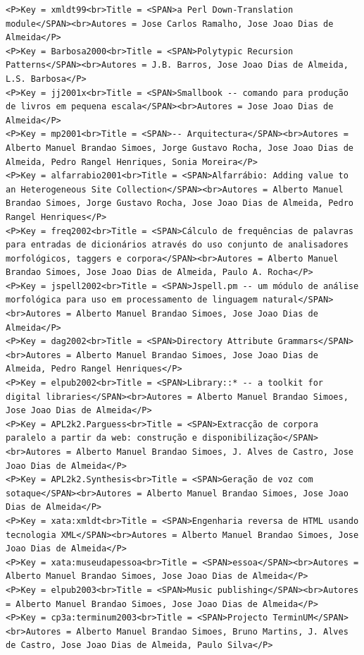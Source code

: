 \documentclass[11pt,a4paper]{report}
\begin{document}
\begin{appendices}
\begin{lstlisting}
<P>Key = xmldt99<br>Title = <SPAN>a Perl Down-Translation module</SPAN><br>Autores = Jose Carlos Ramalho, Jose Joao Dias de Almeida</P>
<P>Key = Barbosa2000<br>Title = <SPAN>Polytypic Recursion Patterns</SPAN><br>Autores = J.B. Barros, Jose Joao Dias de Almeida, L.S. Barbosa</P>
<P>Key = jj2001x<br>Title = <SPAN>Smallbook -- comando para produção de livros em pequena escala</SPAN><br>Autores = Jose Joao Dias de Almeida</P>
<P>Key = mp2001<br>Title = <SPAN>-- Arquitectura</SPAN><br>Autores = Alberto Manuel Brandao Simoes, Jorge Gustavo Rocha, Jose Joao Dias de Almeida, Pedro Rangel Henriques, Sonia Moreira</P>
<P>Key = alfarrabio2001<br>Title = <SPAN>Alfarrábio: Adding value to an Heterogeneous Site Collection</SPAN><br>Autores = Alberto Manuel Brandao Simoes, Jorge Gustavo Rocha, Jose Joao Dias de Almeida, Pedro Rangel Henriques</P>
<P>Key = freq2002<br>Title = <SPAN>Cálculo de frequências de palavras para entradas de dicionários através do uso conjunto de analisadores morfológicos, taggers e corpora</SPAN><br>Autores = Alberto Manuel Brandao Simoes, Jose Joao Dias de Almeida, Paulo A. Rocha</P>
<P>Key = jspell2002<br>Title = <SPAN>Jspell.pm -- um módulo de análise morfológica para uso em processamento de linguagem natural</SPAN><br>Autores = Alberto Manuel Brandao Simoes, Jose Joao Dias de Almeida</P>
<P>Key = dag2002<br>Title = <SPAN>Directory Attribute Grammars</SPAN><br>Autores = Alberto Manuel Brandao Simoes, Jose Joao Dias de Almeida, Pedro Rangel Henriques</P>
<P>Key = elpub2002<br>Title = <SPAN>Library::* -- a toolkit for digital libraries</SPAN><br>Autores = Alberto Manuel Brandao Simoes, Jose Joao Dias de Almeida</P>
<P>Key = APL2k2.Parguess<br>Title = <SPAN>Extracção de corpora paralelo a partir da web: construção e disponibilização</SPAN><br>Autores = Alberto Manuel Brandao Simoes, J. Alves de Castro, Jose Joao Dias de Almeida</P>
<P>Key = APL2k2.Synthesis<br>Title = <SPAN>Geração de voz com sotaque</SPAN><br>Autores = Alberto Manuel Brandao Simoes, Jose Joao Dias de Almeida</P>
<P>Key = xata:xmldt<br>Title = <SPAN>Engenharia reversa de HTML usando tecnologia XML</SPAN><br>Autores = Alberto Manuel Brandao Simoes, Jose Joao Dias de Almeida</P>
<P>Key = xata:museudapessoa<br>Title = <SPAN>essoa</SPAN><br>Autores = Alberto Manuel Brandao Simoes, Jose Joao Dias de Almeida</P>
<P>Key = elpub2003<br>Title = <SPAN>Music publishing</SPAN><br>Autores = Alberto Manuel Brandao Simoes, Jose Joao Dias de Almeida</P>
<P>Key = cp3a:terminum2003<br>Title = <SPAN>Projecto TerminUM</SPAN><br>Autores = Alberto Manuel Brandao Simoes, Bruno Martins, J. Alves de Castro, Jose Joao Dias de Almeida, Paulo Silva</P>

\end{lstlisting}
\end{appendices}
\end{document}
